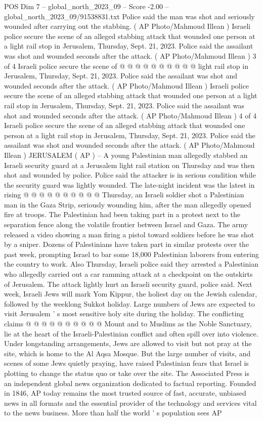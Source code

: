 \begin{textsample}{POS Dim 7 – global\_north\_2023\_09 – Score -2.00 – global\_north\_2023\_09/91538831.txt}
Police said the man was shot and seriously wounded after carrying out the stabbing. ( AP Photo/Mahmoud Illean ) Israeli police secure the scene of an alleged stabbing attack that wounded one person at a light rail stop in Jerusalem, Thursday, Sept. 21, 2023.
Police said the assailant was shot and wounded seconds after the attack. ( AP Photo/Mahmoud Illean ) 3 of 4 Israeli police secure the scene of @ @ @ @ @ @ @ @ @ @ light rail stop in Jerusalem, Thursday, Sept. 21, 2023.
Police said the assailant was shot and wounded seconds after the attack. ( AP Photo/Mahmoud Illean ) Israeli police secure the scene of an alleged stabbing attack that wounded one person at a light rail stop in Jerusalem, Thursday, Sept. 21, 2023.
Police said the assailant was shot and wounded seconds after the attack. ( AP Photo/Mahmoud Illean ) 4 of 4 Israeli police secure the scene of an alleged stabbing attack that wounded one person at a light rail stop in Jerusalem, Thursday, Sept. 21, 2023.
Police said the assailant was shot and wounded seconds after the attack. ( AP Photo/Mahmoud Illean ) JERUSALEM ( AP ) -- A young Palestinian man allegedly stabbed an Israeli security guard at a Jerusalem light rail station on Thursday and was then shot and wounded by police.
Police said the attacker is in serious condition while the security guard was lightly wounded.
The late-night incident was the latest in rising @ @ @ @ @ @ @ @ @ @ Thursday, an Israeli soldier shot a Palestinian man in the Gaza Strip, seriously wounding him, after the man allegedly opened fire at troops.
The Palestinian had been taking part in a protest next to the separation fence along the volatile frontier between Israel and Gaza.
The army released a video showing a man firing a pistol toward soldiers before he was shot by a sniper.
Dozens of Palestinians have taken part in similar protests over the past week, prompting Israel to bar some 18,000 Palestinian laborers from entering the country to work.
Also Thursday, Israeli police said they arrested a Palestinian who allegedly carried out a car ramming attack at a checkpoint on the outskirts of Jerusalem.
The attack lightly hurt an Israeli security guard, police said.
Next week, Israeli Jews will mark Yom Kippur, the holiest day on the Jewish calendar, followed by the weeklong Sukkot holiday.
Large numbers of Jews are expected to visit Jerusalem ' s most sensitive holy site during the holiday.
The conflicting claims @ @ @ @ @ @ @ @ @ @ Mount and to Muslims as the Noble Sanctuary, lie at the heart of the Israeli-Palestinian conflict and often spill over into violence.
Under longstanding arrangements, Jews are allowed to visit but not pray at the site, which is home to the Al Aqsa Mosque.
But the large number of visits, and scenes of some Jews quietly praying, have raised Palestinian fears that Israel is plotting to change the status quo or take over the site.
The Associated Press is an independent global news organization dedicated to factual reporting.
Founded in 1846, AP today remains the most trusted source of fast, accurate, unbiased news in all formats and the essential provider of the technology and services vital to the news business.
More than half the world ' s population sees AP


\end{textsample}
